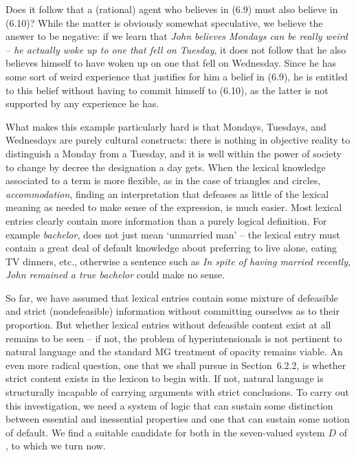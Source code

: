 \noindent
Does it follow that a (rational) agent who believes in (6.9) must also believe
in (6.10)? While the matter is obviously somewhat speculative, we believe the
answer to be negative: if we learn that {\it John believes Mondays can be
really weird -- he actually woke up to one that fell on Tuesday}, it does not
follow that he also believes himself to have woken up on one that fell on
Wednesday. Since he has some sort of weird experience that justifies for him a
belief in (6.9), he is entitled to this belief without having to commit
himself to (6.10), as the latter is not supported by any experience he has.

What makes this example particularly hard is that Mondays, Tuesdays, and
Wednesdays are purely cultural constructs: there is nothing in objective
reality to distinguish a Monday from a Tuesday, and it is well within the
power of society to change by decree the designation a day gets. When the
lexical knowledge associated to a term is more flexible, as in the case of
triangles and circles, {\it accommodation}, finding an interpretation that
defeases as little of the lexical meaning as needed to make sense of the
expression, is much easier.  Most lexical entries clearly
contain more information than a purely logical definition. For example {\it
  bachelor}, does not just mean `unmarried man' -- the lexical entry must
contain a great deal of default knowledge about preferring to live alone,
eating TV dinners, etc., otherwise a sentence such as {\it In spite of having
  married recently, John remained a true bachelor} could make no sense.

So far, we have assumed that lexical entries contain some mixture of
defeasible and strict (nondefeasible) information without committing ourselves
as to their proportion. But whether lexical entries without defeasible content
exist at all remains to be seen -- if not, the problem of hyperintensionals is
not pertinent to natural language and the standard MG treatment of opacity
remains viable. An even more radical question, one that we shall pursue in
Section~6.2.2, is whether strict content exists in the lexicon to begin with.
If not, natural language is structurally incapable of carrying arguments with
strict conclusions. To carry out this investigation, we need a system of logic
that can sustain some distinction between essential and inessential properties
and one that can sustain some notion of default.  We find a suitable candidate
for both in the seven-valued system $D$ of , to which
we turn now.


